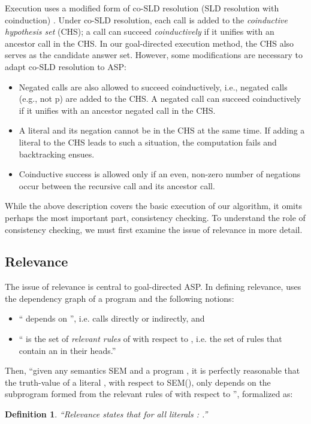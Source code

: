 \documentclass{new_tlp}
\newtheorem{definition}{Definition}
\begin{document}
Execution uses a modified form of co-SLD resolution (SLD resolution with 
coinduction) \cite{coinduction}. Under co-SLD resolution, each call is added to 
the \textit{coinductive hypothesis set} (CHS); a call can succeed 
{\it coinductively} if it unifies with an ancestor call in the CHS. In our 
goal-directed execution method, the CHS also serves as the candidate answer set.
However, some modifications are necessary to adapt co-SLD resolution to ASP:
\begin{itemize}
\item Negated calls are also allowed to succeed coinductively, i.e., negated
calls (e.g., not p) are added to the CHS. A negated call can
succeed coinductively if it unifies with an ancestor negated call in the CHS.
\item A literal and its negation cannot be in the CHS at the same time. If 
adding a literal to the CHS leads to such a situation, the computation fails 
and backtracking ensues.
\item Coinductive success is allowed only if an even, non-zero number of 
 negations occur between the recursive call and its ancestor call.
\end{itemize}


While the above description covers the basic execution of our algorithm, it 
omits perhaps the most important part, consistency checking. To understand the 
role of consistency checking, we must first examine the issue of relevance in 
more detail.

\subsection{Relevance} \label{sec:relevance}

The issue of relevance is central to goal-directed ASP. In defining relevance,
\cite{dix95} uses the dependency graph of a program  and the following
notions:
\begin{itemize}
\item `` depends on '', i.e.  calls 
 directly or indirectly, and
\item `` is the set of \textit{relevant rules} of  with 
respect to , i.e. the set of rules that contain an
 in their heads.''
\end{itemize}
Then, ``given any semantics SEM and a program , it is perfectly reasonable 
that the truth-value of a literal , with respect to SEM(), only depends 
on the subprogram formed from the relevant rules of  with respect to '', 
formalized as:
\begin{definition} \label{def:relevance}
``Relevance states that for all literals :
.'' \cite{dix95}
\end{definition}
\end{document}
